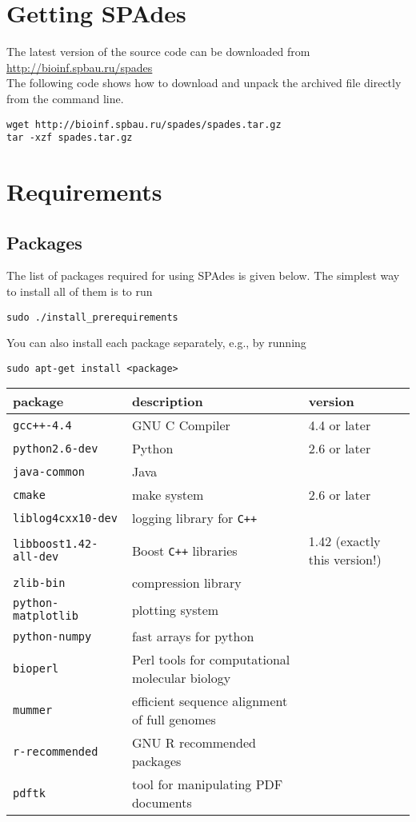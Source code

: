 \documentclass{article}
\def\spades{SPAdes}
\begin{document}
\section{Getting {\spades}}
The latest version of the source code can be downloaded from\\
\url{http://bioinf.spbau.ru/spades}\\
The following code shows how to download and unpack the archived file
directly from the command line.

\begin{lstlisting}
wget http://bioinf.spbau.ru/spades/spades.tar.gz
tar -xzf spades.tar.gz
\end{lstlisting}

\section{Requirements}\label{section:requirements}
\subsection{Packages}\label{subsection:packages}
The list of packages required for using {\spades} is given below.
The simplest way to install all of them is to run
\begin{lstlisting}
sudo ./install_prerequirements
\end{lstlisting}
You can also install each package separately, e.g., by running
\begin{lstlisting}
sudo apt-get install <package>
\end{lstlisting}

\begin{center}
\begin{tabular}{lll}
\toprule
package & description & version\\
\midrule
{\tt gcc++-4.4} & GNU C Compiler & 4.4 or later\\
{\tt python2.6-dev} & Python & 2.6 or later\\
{\tt java-common} & Java & \\
{\tt cmake} & make system & 2.6 or later\\
{\tt liblog4cxx10-dev} & logging library for {\tt C++} & \\
{\tt libboost1.42-all-dev} & Boost {\tt C++} libraries & 1.42 (exactly this version!) \\
{\tt zlib-bin} & compression library & \\
{\tt python-matplotlib} & plotting system & \\
{\tt python-numpy} & fast arrays for python & \\
{\tt bioperl} & Perl tools for computational molecular biology & \\
{\tt mummer} & efficient sequence alignment of full genomes & \\
{\tt r-recommended} & GNU R recommended packages & \\
{\tt pdftk} & tool for manipulating PDF documents & \\
\bottomrule
\end{tabular}
\end{center}
\end{document}
